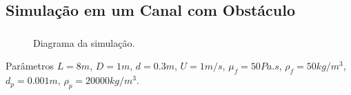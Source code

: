 \documentclass{beamer}
\begin{document}
\subsection*{Simulação em um Canal com Obstáculo}
\begin{frame}
  \frametitle{\subsecname}
  
  \begin{figure}
     {\raggedleft \tiny Diagrama da simulação.}
  \end{figure}
  \begin{block}{Parâmetros}
    $L=8m$, $D=1m$, $d=0.3m$, $U=1m/s$, $\mu_f=50Pa.s$, $\rho_f=50kg/m^3$, $d_p=0.001m$, $\rho_p=20000kg/m^3$.
  \end{block}
\end{frame}
\end{document}
